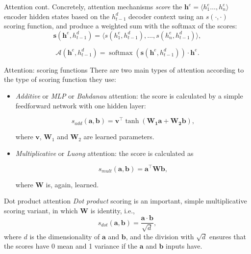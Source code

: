 \documentclass[style=upen, size=14pt]{powerdot}
\DeclareMathOperator*{\softmax}{softmax}
\newcommand{\gold}{\color{arany}}
\theoremstyle{definition}
\begin{document}
\begin{slide}[toc=]{Attention cont.}
  Concretely, attention mechanisms \emph{score} the
  $\mathbf{h}^e=\langle h_1^e\dots,h_n^e \rangle$ encoder hidden states based on
  the $h^d_{t-1}$ decoder context using an $s(\cdot, \cdot)$ scoring function, and
  produce a weighted sum with the softmax of the scores:
  $$
  \mathbf{s}(\mathbf{h}^e, h_{t-1}^d ) =\langle s({h}^e_1, h_{t-1}^d),\dots,
  s({h}^e_n, h_{t-1}^d) \rangle,
  $$
  
  $$
  \mathcal A(\mathbf{h}^e, h_{t-1}^d) =  \softmax(\mathbf{s}(\mathbf{h}^e, h_{t-1}^d )) \cdot \mathbf{h}^e.
  $$
\end{slide}

\begin{slide}[toc=]{Attention: scoring functions}
  There are two main types of attention according to the type of scoring
  function they use:
  \begin{itemize}
  \item \emph{\gold Additive} or \emph{\gold MLP} or \emph{\gold Bahdanau}
    attention: the score is calculated by a simple feedforward network with one
    hidden layer:
    \begin{small}
      $$
      s_{add}(\mathbf{a}, \mathbf{b}) =
      \mathbf{v^\intercal}\tanh(\mathbf{W_1\mathbf{a} + \mathbf{W_2} \mathbf{b}}),
      $$
    \end{small}
    where $\mathbf{v}$, $\mathbf{W}_1$ and $\mathbf{W}_2$ are learned 
    parameters.
  \item \emph{\gold Multiplicative} or \emph{\gold Luong} attention: the score
    is calculated as
    \begin{small}
      $$
      s_{mult}(\mathbf{a}, \mathbf{b}) =
      \mathbf{a}^{\intercal} \mathbf{W} \mathbf{b},
      $$
    \end{small}
    where $\mathbf{W}$ is, again, learned.
  \end{itemize}
\end{slide}

\begin{slide}[toc=]{Dot product attention}
  \emph{\gold Dot product} scoring is an important, simple multiplicative
  scoring variant, in which $\mathbf{W}$ is identity, i.e.,
  $$
  s_{dot}(\mathbf{a}, \mathbf{b}) = \frac{\mathbf{a} \cdot \mathbf{b}}{\sqrt d},
  $$
  where $d$ is the dimensionality of $\mathbf{a}$ and $\mathbf{b}$, and the
  division with $\sqrt d$ ensures that the scores have 0 mean and 1 variance if the
  $\mathbf{a}$ and $\mathbf{b}$ inputs have.
\end{slide}
\end{document}
